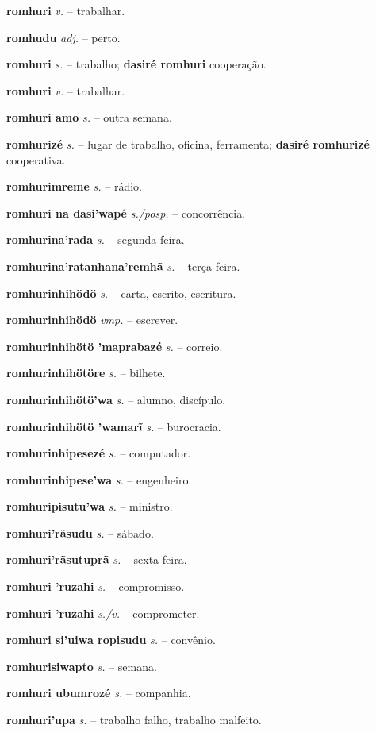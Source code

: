 \textbf{romhuri} \textit{v.} -- trabalhar.

\textbf{romhudu} \textit{adj.} -- perto.

\textbf{romhuri} \textit{s.} -- trabalho; \textbf{dasiré romhuri} cooperação.

\textbf{romhuri} \textit{v.} -- trabalhar.

\textbf{romhuri amo} \textit{s.} -- outra semana.

\textbf{romhurizé} \textit{s.} -- lugar de trabalho, oficina, ferramenta; \textbf{dasiré romhurizé} cooperativa.

\textbf{romhurimreme} \textit{s.} -- rádio.

\textbf{romhuri na dasi'wapé} \textit{s./posp.} -- concorrência.

\textbf{romhurina'rada} \textit{s.} -- segunda-feira.

\textbf{romhurina'ratanhana'remhã} \textit{s.} -- terça-feira.

\textbf{romhurinhihödö} \textit{s.} -- carta, escrito, escritura.

\textbf{romhurinhihödö} \textit{vmp.} -- escrever.

\textbf{romhurinhihötö 'maprabazé} \textit{s.} -- correio.

\textbf{romhurinhihötöre} \textit{s.} -- bilhete.

\textbf{romhurinhihötö'wa} \textit{s.} -- alumno, discípulo.

\textbf{romhurinhihötö 'wamarĩ} \textit{s.} -- burocracia.

\textbf{romhurinhipesezé} \textit{s.} -- computador.

\textbf{romhurinhipese'wa} \textit{s.} -- engenheiro.

\textbf{romhuripisutu'wa} \textit{s.} -- ministro.

\textbf{romhuri'rãsudu} \textit{s.} -- sábado.

\textbf{romhuri'rãsutuprã} \textit{s.} -- sexta-feira.

\textbf{romhuri 'ruzahi} \textit{s.} -- compromisso.

\textbf{romhuri 'ruzahi} \textit{s./v.} -- comprometer.

\textbf{romhuri si'uiwa ropisudu} \textit{s.} -- convênio.

\textbf{romhurisiwapto} \textit{s.} -- semana.

\textbf{romhuri ubumrozé} \textit{s.} -- companhia.

\textbf{romhuri'upa} \textit{s.} -- trabalho falho, trabalho malfeito.

